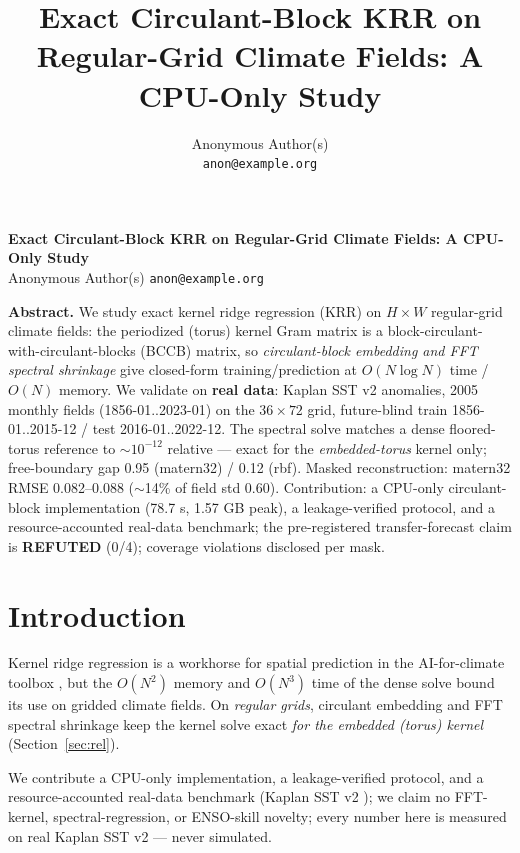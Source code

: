 \documentclass{article}
\title{Exact Circulant-Block KRR on Regular-Grid Climate Fields: A CPU-Only Study}
\author{%
  Anonymous Author(s) \\
  \texttt{anon@example.org} \\
}
\begin{document}
{\centering
{\Large\bfseries Exact Circulant-Block KRR on Regular-Grid Climate Fields:
A CPU-Only Study}\\[0.6ex]
Anonymous Author(s) \quad \texttt{anon@example.org}\par}
\vspace{1.4ex}

\noindent\textbf{Abstract.} We study exact kernel ridge regression (KRR) on
$H\times W$ regular-grid climate fields: the periodized (torus) kernel Gram
matrix is a block-circulant-with-circulant-blocks (BCCB) matrix, so
\emph{circulant-block embedding and FFT spectral shrinkage} give closed-form training/prediction at $O(N\log N)$ time /
$O(N)$ memory. We validate on \textbf{real data}: Kaplan SST v2 anomalies,
2005 monthly fields (1856-01..2023-01) on the $36\times72$ grid,
future-blind train 1856-01..2015-12 / test 2016-01..2022-12. The spectral
solve matches a dense floored-torus reference to $\sim\!10^{-12}$ relative
--- exact for the \emph{embedded-torus} kernel only; free-boundary gap 0.95
(matern32) / 0.12 (rbf). Masked reconstruction: matern32 RMSE 0.082--0.088
($\sim$14\% of field std 0.60). Contribution: a CPU-only circulant-block
implementation (78.7 s, 1.57 GB peak), a leakage-verified protocol, and a
resource-accounted real-data benchmark; the pre-registered transfer-forecast
claim is \textbf{REFUTED} (0/4); coverage violations disclosed per mask.

\section{Introduction}
\label{sec:intro}

Kernel ridge regression is a workhorse for spatial prediction in the
AI-for-climate toolbox \cite{ccai2026workshop}, but the $O(N^2)$ memory and
$O(N^3)$ time of the dense solve bound its use on gridded climate fields.
On \emph{regular grids}, circulant embedding \cite{dietrich1997fast,
wood1994statistical} and FFT spectral shrinkage keep the kernel solve exact
\emph{for the embedded (torus) kernel} \cite{gray2006toeplitz} (Section~\ref{sec:rel}).

We contribute a CPU-only implementation, a leakage-verified protocol, and a
resource-accounted real-data benchmark (Kaplan SST v2
\cite{kaplan1998analyses}); we claim no FFT-kernel,
spectral-regression, or ENSO-skill novelty; every number here is measured on
real Kaplan SST v2 --- never simulated.
\end{document}
